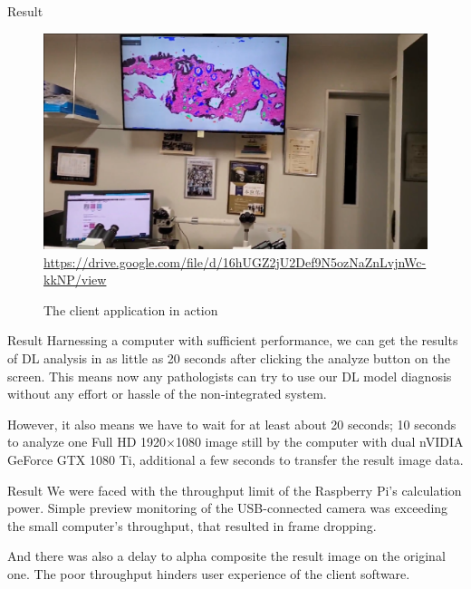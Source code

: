 \documentclass[
  dvipdfmx,
  xcolor={svgnames},
  hyperref={colorlinks,citecolor=DeepPink4,linkcolor=DarkRed,urlcolor=DarkBlue}
  ]{beamer}
\begin{document}
\begin{frame}{Result}
  \begin{figure}[t]\centering
    \includegraphics[width=\columnwidth, keepaspectratio]{assets/thumb.png}
    \scriptsize \href{https://drive.google.com/file/d/16hUGZ2jU2Def9N5ozNaZnLvjnWc-kkNP/view}{https://drive.google.com/file/d/16hUGZ2jU2Def9N5ozNaZnLvjnWc-kkNP/view}
    \caption{The client application in action}
    \label{fig:in_action}
  \end{figure}
\end{frame}

\begin{frame}{Result}
  Harnessing a computer with sufficient performance, we can get the results of DL analysis in as little as 20 seconds after clicking the analyze button on the screen. This means now any pathologists can try to use our DL model diagnosis without any effort or hassle of the non-integrated system.
  \par
  \vspace{0.5zh}
  However, it also means we have to wait for at least about 20 seconds; 10 seconds to analyze one Full HD 1920×1080 image still by the computer with dual nVIDIA GeForce GTX 1080 Ti, additional a few seconds to transfer the result image data.
\end{frame}

\begin{frame}{Result}
  We were faced with the throughput limit of the Raspberry Pi's calculation power. Simple preview monitoring of the USB-connected camera was exceeding the small computer's throughput, that resulted in frame dropping.
  \par
  \vspace{0.5zh}
  And there was also a delay to alpha composite the result image on the original one. The poor throughput hinders user experience of the client software.
\end{frame}
\end{document}
